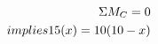 \documentclass[preview]{standalone}
\begin{document}
\begin{align*}
\special{dvisvgm:raw <g id='unique000'>}\Sigma M_C = 0 \\implies 15(x) = 10(10 - x)\special{dvisvgm:raw </g>}
\end{align*}
\end{document}

